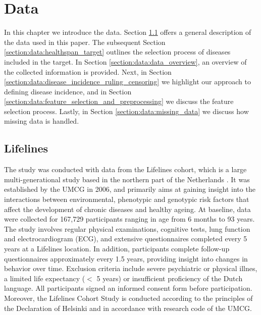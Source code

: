 \chapter{Data}
\label{chap:data}
In this chapter we introduce the data. Section \ref{section:data:data_description} offers a general description of the data used in this paper. The subsequent Section \ref{section:data:healthspan_target} outlines the selection process of diseases included in the target. In Section \ref{section:data:data_overview}, an overview of the collected information is provided. Next, in Section \ref{section:data:disease_incidence_ruling_censoring} we highlight our approach to defining disease incidence, and in Section \ref{section:data:feature_selection_and_preprocessing} we discuss the feature selection process. Lastly, in Section \ref{section:data:missing_data} we discuss how missing data is handled. 

\section{Lifelines}
\label{section:data:data_description}
The study was conducted with data from the Lifelines cohort, which is a large multi-generational study based in the northern part of the Netherlands \citep{Lifelines}. It was established by the UMCG in 2006, and primarily aims at gaining insight into the interactions between environmental, phenotypic and genotypic risk factors that affect the development of chronic diseases and healthy ageing. At baseline, data were collected for 167,729 participants ranging in age from 6 months to 93 years. The study involves regular physical examinations, cognitive tests, lung function and electrocardiogram (ECG), and extensive questionnaires completed every 5 years at a Lifelines location. In addition, participants complete follow-up questionnaires approximately every 1.5 years, providing insight into changes in behavior over time.
Exclusion criteria include severe psychiatric or physical illnes, a limited life expectancy ($<$ 5 years) or insufficient proficiency of the Dutch language. All participants signed an informed consent form before participation. Moreover, the Lifelines Cohort Study is conducted according to the principles of the Declaration of Helsinki and in accordance with research code of the UMCG.

